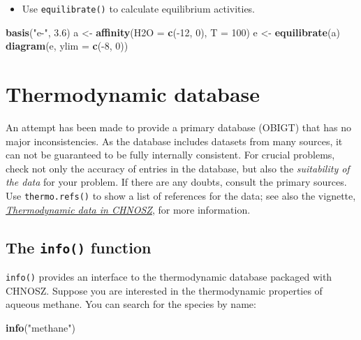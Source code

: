 \documentclass[]{tufte-book}
\newenvironment{Shaded}{}{}
\newcommand{\KeywordTok}[1]{\textcolor[rgb]{0.00,0.44,0.13}{\textbf{#1}}}
\newcommand{\DataTypeTok}[1]{\textcolor[rgb]{0.56,0.13,0.00}{#1}}
\newcommand{\DecValTok}[1]{\textcolor[rgb]{0.25,0.63,0.44}{#1}}
\newcommand{\FloatTok}[1]{\textcolor[rgb]{0.25,0.63,0.44}{#1}}
\newcommand{\StringTok}[1]{\textcolor[rgb]{0.25,0.44,0.63}{#1}}
\newcommand{\OperatorTok}[1]{\textcolor[rgb]{0.40,0.40,0.40}{#1}}
\newcommand{\NormalTok}[1]{#1}
\providecommand{\tightlist}{%
  \setlength{\itemsep}{0pt}\setlength{\parskip}{0pt}}
\begin{document}
\begin{itemize}
\tightlist
\item
  Use {\texttt{equilibrate()}} to calculate equilibrium activities.
\end{itemize}

\begin{Shaded}
\begin{Highlighting}[]
\KeywordTok{basis}\NormalTok{(}\StringTok{"e-"}\NormalTok{, }\FloatTok{3.6}\NormalTok{)}
\NormalTok{a <-}\StringTok{ }\KeywordTok{affinity}\NormalTok{(}\DataTypeTok{H2O =} \KeywordTok{c}\NormalTok{(}\OperatorTok{-}\DecValTok{12}\NormalTok{, }\DecValTok{0}\NormalTok{), }\DataTypeTok{T =} \DecValTok{100}\NormalTok{)}
\NormalTok{e <-}\StringTok{ }\KeywordTok{equilibrate}\NormalTok{(a)}
\KeywordTok{diagram}\NormalTok{(e, }\DataTypeTok{ylim =} \KeywordTok{c}\NormalTok{(}\OperatorTok{-}\DecValTok{8}\NormalTok{, }\DecValTok{0}\NormalTok{))}
\end{Highlighting}
\end{Shaded}

\chapter{Thermodynamic database}\label{thermodynamic-database}

An attempt has been made to provide a primary database (OBIGT) that has
no major inconsistencies. As the database includes datasets from many
sources, it can not be guaranteed to be fully internally consistent. For
crucial problems, check not only the accuracy of entries in the
database, but also the \emph{suitability of the data} for your problem.
If there are any doubts, consult the primary sources. Use
{\texttt{thermo.refs()}} to show a list of references for the data; see
also the vignette, \href{obigt.html}{{\emph{Thermodynamic data in
CHNOSZ}}}, for more information.

\section{\texorpdfstring{The {\texttt{info()}}
function}{The info() function}}\label{the-info-function}

{\texttt{info()}} provides an interface to the thermodynamic database
packaged with CHNOSZ. Suppose you are interested in the thermodynamic
properties of aqueous methane. You can search for the species by name:

\begin{Shaded}
\begin{Highlighting}[]
\KeywordTok{info}\NormalTok{(}\StringTok{"methane"}\NormalTok{)}
\end{Highlighting}
\end{Shaded}
\end{document}

